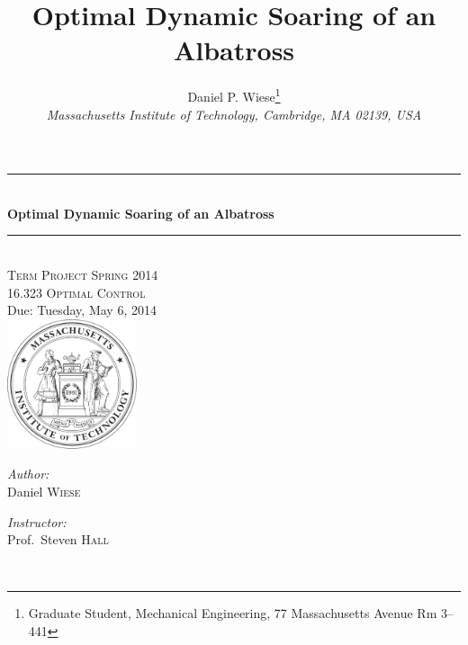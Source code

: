 \documentclass[11pt,letterpaper,onecolumn]{article}
\title{Optimal Dynamic Soaring of an Albatross}
\author{
Daniel P. Wiese\thanks{Graduate Student, Mechanical Engineering, 77 Massachusetts Avenue Rm 3--441} \\
{\normalsize\itshape{}Massachusetts Institute of Technology, Cambridge, MA 02139, USA} \\[4pt]
}
\begin{document}
  \begin{titlepage}
    \begin{center}
      \rule{\linewidth}{0.01in} \\[0.25in]
      { \huge \bfseries Optimal Dynamic Soaring of an Albatross }\\[0.4cm]
      \rule{\linewidth}{0.01in} \\[0.25in]

      \textsc{\LARGE Term Project Spring 2014 }\\[0.05in]
      \textsc{\Large 16.323 Optimal Control}\\[0.25in]
      \large Due: Tuesday, May 6, 2014 \\[1.1in]
      \includegraphics[width=1.5in]{../fig/mit-seal.pdf}\\[2.9in]
      \begin{minipage}{0.4\textwidth}
        \begin{flushleft} \large
          \emph{Author:}\\
          Daniel \textsc{Wiese}
          \vfill
        \end{flushleft}
      \end{minipage}
      \begin{minipage}{0.4\textwidth}
        \begin{flushright} \large
          \emph{Instructor:} \\
          Prof.~Steven \textsc{Hall} \\
        \end{flushright}
      \end{minipage} \\
      \vfill
    \end{center}
  \end{titlepage}

  \clearpage
\end{document}
